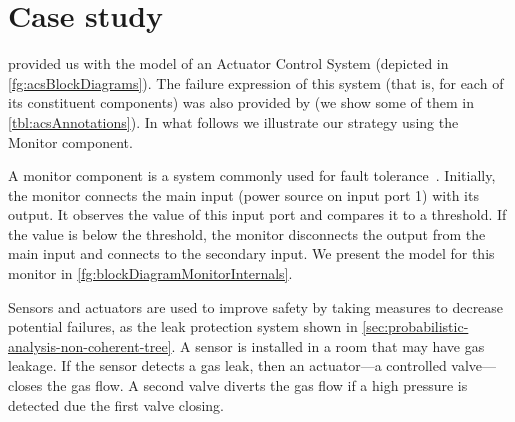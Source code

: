 \chapter{Case study}
\label{chap:case-study}

\Embraer provided us with the \simulink model of an Actuator Control System (depicted in \cref{fg:acsBlockDiagrams}).
The failure expression of this system (that is, for each of its constituent components) was also provided by \embraer (we show some of them in \cref{tbl:acsAnnotations}).
In what follows we illustrate our strategy using the Monitor component.

A monitor component is a system commonly used for fault tolerance~\cite{ONB2002,KK2007}.
Initially, the monitor connects the main input (power source on input port 1) with its output.
It observes the value of this input port and compares it to a threshold.
If the value is below the threshold, the monitor disconnects the output from the main input and connects to the secondary input.
We present the \simulink model for this monitor in \cref{fg:blockDiagramMonitorInternals}.


Sensors and actuators are used to improve safety by taking measures to decrease potential failures, as the leak protection system shown in \cref{sec:probabilistic-analysis-non-coherent-tree}.
A sensor is installed in a room that may have gas leakage.
If the sensor detects a gas leak, then an actuator---a controlled valve---closes the gas flow.
A second valve diverts the gas flow if a high pressure is detected due the first valve closing.


